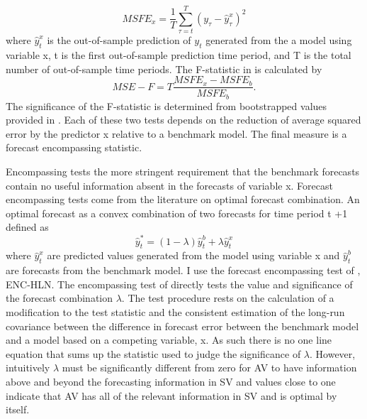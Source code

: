 \begin{equation} \label{eq:msfe}
	MSFE_{x} = \frac{1}{T} \sum_{\tau=t}^{T} (y_{\tau} - \hat{y}^{x}_{\tau})^{2}
\end{equation}
where $\hat{y}^{x}_{t}$ is the out-of-sample prediction of $y_{t}$ generated from the a model using variable x, t is the first out-of-sample prediction time period, and T is the total number of out-of-sample time periods. The F-statistic in \citet{mccracken_asymptotics_2007} is calculated by
\begin{equation} \label{eq:mse-f}
MSE-F = T \frac{MSFE_{x}-MSFE_{b}}{MSFE_{b}}.
\end{equation}
The significance of the F-statistic is determined from bootstrapped values provided in \citet{mccracken_asymptotics_2007}.
Each of these two tests depends on the reduction of average squared error by the predictor x relative to a benchmark model. The final measure is a forecast encompassing statistic. 

Encompassing tests the more stringent requirement that the benchmark forecasts contain no useful information absent in the forecasts of variable x. Forecast encompassing tests come from the literature on optimal forecast combination. \citep{Chong1986,Fair1990} An optimal forecast as a convex combination of two forecasts for time period t +1 defined as
\begin{equation} \label{eq:forecast_comb}
\hat y^{*}_{t} = (1-\lambda)\hat y^{b}_{t} + \lambda \hat y^{x}_{t}
\end{equation}
where $\hat y^{x}_{t}$ are predicted values generated from the model using variable x and $\hat y^{b}_{t}$ are forecasts from the benchmark model. I use the forecast encompassing test of \citet{harvey_tests_1998}, ENC-HLN.
The encompassing test of \citet{harvey_tests_1998} directly tests the value and significance of the forecast combination $\lambda$. The test procedure rests on the calculation of a modification to the \citet{Diebold1995} test statistic and the consistent estimation of the long-run covariance between the difference in forecast error between the benchmark model and a model based on a competing variable, x. As such there is no one line equation that sums up the statistic used to judge the significance of $\lambda$. However, intuitively $\lambda$ must be significantly different from zero for AV to have information above and beyond the forecasting information in SV and values close to one indicate that AV has all of the relevant information in SV and is optimal by itself.

